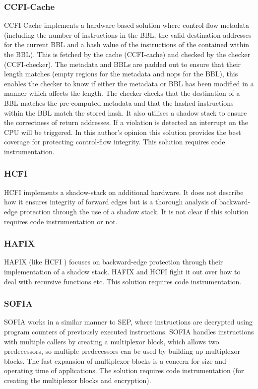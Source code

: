 \subsubsection{CCFI-Cache}
CCFI-Cache \cite{Danger2018} implements a hardware-based solution where control-flow metadata (including the number of instructions in the BBL, the valid destination addresses for the current BBL and a hash value of the instructions of the contained within the BBL). This is fetched by the cache (CCFI-cache) and checked by the checker (CCFI-checker). The metadata and BBLs are padded out to ensure that their length matches (empty regions for the metadata and nops for the BBL), this enables the checker to know if either the metadata or BBL has been modified in a manner which affects the length. The checker checks that the destination of a BBL matches the pre-computed metadata and that the hashed instructions within the BBL match the stored hash. It also utilises a shadow stack to ensure the correctness of return addresses. If a violation is detected an interrupt on the CPU will be triggered. In this author's opinion this solution provides the best coverage for protecting control-flow integrity. This solution requires code instrumentation.

\subsubsection{HCFI}
HCFI \cite{Danger2018} implements a shadow-stack on additional hardware. It does not describe how it ensures integrity of forward edges but is a thorough analysis of backward-edge protection through the use of a shadow stack. It is not clear if this solution requires code instrumentation or not.

\subsubsection{HAFIX}
HAFIX \cite{Davi2015} (like HCFI \cite{Danger2018}) focuses on backward-edge protection through their implementation of a shadow stack. HAFIX and HCFI fight it out over how to deal with recursive functions etc. This solution requires code instrumentation.

\subsubsection{SOFIA}
SOFIA \cite{Davi2015} works in a similar manner to SEP, where instructions are decrypted using program counters of previously executed instructions. SOFIA handles instructions with multiple callers by creating a multiplexor block, which allows two predecessors, so multiple predecessors can  be used by building up multiplexor blocks. The fast expansion of multiplexor blocks is a concern for size and operating time of applications. The solution requires code instrumentation (for creating the multiplexor blocks and encryption).

